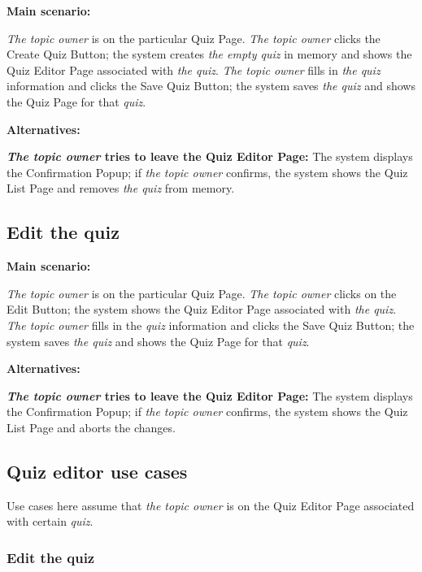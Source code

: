 \documentclass[
    english, %
]{VUMIFPSkursinis}
\begin{document}
\noindent\textbf{\fontsize{13}{15}\selectfont Main scenario:}

\textit{The topic owner} is on the particular Quiz Page. \textit{The topic owner} clicks the Create Quiz Button; the system creates \textit{the empty quiz} in memory and shows the Quiz Editor Page associated with \textit{the quiz}. \textit{The topic owner} fills in \textit{the quiz} information and clicks the Save Quiz Button; the system saves \textit{the quiz} and shows the Quiz Page for that \textit{quiz}.

\noindent\textbf{\fontsize{13}{15}\selectfont Alternatives:}

\textbf{\textit{The topic owner} tries to leave the Quiz Editor Page:} The system displays the Confirmation Popup; if \textit{the topic owner} confirms, the system shows the Quiz List Page and removes \textit{the quiz} from memory.

\subsection{Edit the quiz}

\noindent\textbf{\fontsize{13}{15}\selectfont Main scenario:}

\textit{The topic owner} is on the particular Quiz Page. \textit{The topic owner} clicks on the Edit Button; the system shows the Quiz Editor Page associated with \textit{the quiz}. \textit{The topic owner} fills in the \textit{quiz} information and clicks the Save Quiz Button; the system saves \textit{the quiz} and shows the Quiz Page for that \textit{quiz}.

\noindent\textbf{\fontsize{13}{15}\selectfont Alternatives:}

\textbf{\textit{The topic owner} tries to leave the Quiz Editor Page:} The system displays the Confirmation Popup; if \textit{the topic owner} confirms, the system shows the Quiz List Page and aborts the changes.

\subsection{Quiz editor use cases}

Use cases here assume that \textit{the topic owner} is on the Quiz Editor Page associated with certain \textit{quiz}.

\subsubsection{Edit the quiz}
\end{document}
